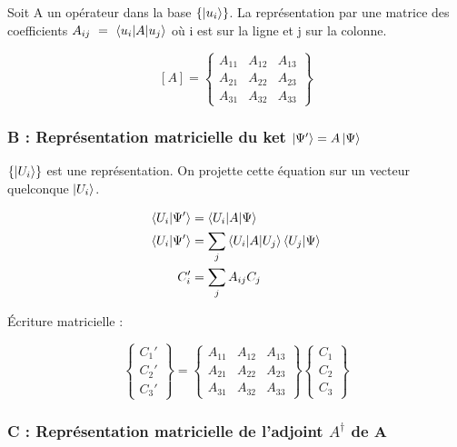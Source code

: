 \documentclass[12pt,a4paper,titlepage]{book}
\begin{document}
Soit A un opérateur dans la base $\lbrace \ket{u_i} \rbrace$. La représentation par une matrice des coefficients $A_{ij} ~=~ \braket{u_i | A | u_j}$ où i est sur la ligne et j sur la colonne.

\begin{center}
\[
[A]=
\left\lbrace
\begin{matrix}
A_{11} & A_{12} & A_{13}\\
A_{21} & A_{22} & A_{23}\\
A_{31} & A_{32} & A_{33}
\end{matrix}
\right\rbrace
\]
\end{center}

\subsubsection{B : Représentation matricielle du ket $\ket{\Psi'} = A \ket{\Psi}$}

$\left\lbrace \ket{U_i} \right\rbrace$ est une représentation. On projette cette équation sur un vecteur quelconque $\ket{U_i}$.

\begin{align*}
\braket{U_i | \Psi'} &= \braket{U_i | A | \Psi}\\
\braket{U_i | \Psi'} &= \sum\limits_{j} \braket{U_i | A | U_j} \braket{U_j | \Psi}\\
C_i' &= \sum\limits_j A_{i j} C_j
\end{align*}

Écriture matricielle :

\begin{center}
\[
\left\lbrace
\begin{matrix}
C_{1}'\\
C_{2}'\\
C_{3}'
\end{matrix}
\right\rbrace = \left\lbrace
\begin{matrix}
A_{11} & A_{12} & A_{13}\\
A_{21} & A_{22} & A_{23}\\
A_{31} & A_{32} & A_{33}
\end{matrix}
\right\rbrace \left\lbrace
\begin{matrix}
C_1\\
C_2\\
C_3
\end{matrix}
\right\rbrace
\]
\end{center}

\subsubsection{C : Représentation matricielle de l'adjoint $A^{\dagger}$ de A}
\end{document}
